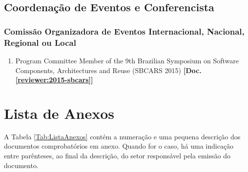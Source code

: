 \documentclass[a4paper,oneside,12pt]{article}
\newcounter{document}%
\begin{document}
\subsection{Coordenação de Eventos e Conferencista}
\vspace{0.3cm}


\subsubsection{Comissão Organizadora de Eventos Internacional, Nacional, Regional ou Local}
\vspace{0.3cm}

\begin{enumerate}
\renewcommand{\labelenumi}{{\large\bfseries\arabic{enumi}.}}

    \item Program Committee Member of the 9th Brazilian Symposium on Software Components, Architectures and Reuse (SBCARS 2015) \textbf{[Doc. \ref{reviewer:2015-sbcars}]}

\end{enumerate}






\newpage
\section{Lista de Anexos}

A Tabela \ref{Tab:ListaAnexos} contém a numeração e uma pequena descrição dos documentos comprobatórios em anexo. Quando for o caso, há uma indicação entre parênteses, ao final da descrição, do setor responsável pela emissão do documento.
\end{document}
